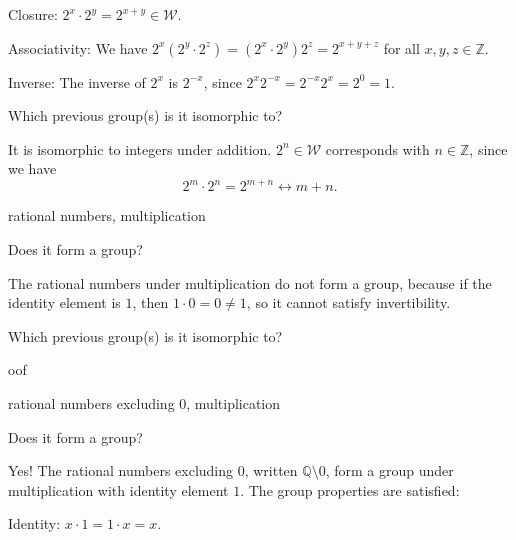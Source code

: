 \documentclass[../gatm_answers.tex]{subfiles}
\begin{document}
Closure: $2^x\cdot 2^y = 2^{x+y} \in \mathcal{W}$.

Associativity: We have $2^{x}(2^{y}\cdot 2^{z})=(2^{x}\cdot 2^{y})2^{z}=2^{x+y+z}$ for all $x,y,z \in \mathbb{Z}$.

Inverse: The inverse of $2^x$ is $2^{-x}$, since $2^{x}2^{-x}=2^{-x}2^{x}=2^0=1$.

\begin{iinner_problem}
\item Which previous group(s) is it isomorphic to?
\end{iinner_problem}

It is isomorphic to integers under addition. $2^n\in \mathcal{W}$ corresponds with $n\in \mathbb{Z}$, since we have $$2^m\cdot 2^n=2^{m+n}\leftrightarrow m+n.$$

\begin{inner_problem}
\item rational numbers, multiplication
\end{inner_problem}

\begin{iinner_problem}[start=1]
\item Does it form a group?
\end{iinner_problem}

The rational numbers under multiplication do not form a group, because if the identity element is $1$, then $1\cdot 0 = 0\neq 1$, so it cannot satisfy invertibility.

\begin{iinner_problem}
\item Which previous group(s) is it isomorphic to?
\end{iinner_problem}

oof

\begin{inner_problem}
\item rational numbers excluding $0$, multiplication
\end{inner_problem}

\begin{iinner_problem}[start=1]
\item Does it form a group?
\end{iinner_problem}

Yes! The rational numbers excluding $0$, written $\mathbb{Q} \setminus {0}$, form a group under multiplication with identity element $1$. The group properties are satisfied:

Identity: $x\cdot 1=1\cdot x=x$.
\end{document}
